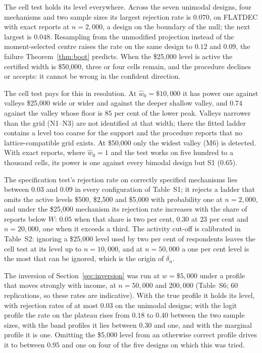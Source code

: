 The cell test holds its level everywhere. Across the seven unimodal designs, four mechanisms and two sample sizes its largest rejection rate is $0.070$, on FLATDEC with exact reports at $n=2{,}000$, a design on the boundary of the null; the next largest is $0.048$. Resampling from the unmodified projection instead of the moment-selected centre raises the rate on the same design to $0.12$ and $0.09$, the failure Theorem~\ref{thm:boot} predicts. When the \$25{,}000 level is active the certified width is \$50{,}000, three or four cells remain, and the procedure declines or accepts: it cannot be wrong in the confident direction.

The cell test pays for this in resolution. At $\hat w_0=\$10{,}000$ it has power one against valleys \$25{,}000 wide or wider and against the deeper shallow valley, and $0.74$ against the valley whose floor is $85$ per cent of the lower peak. Valleys narrower than the grid (N1--N3) are not identified at that width; there the fitted ladder contains a level too coarse for the support and the procedure reports that no lattice-compatible grid exists. At \$50{,}000 only the widest valley (M6) is detected. With exact reports, where $\hat w_0=1$ and the test works on five hundred to a thousand cells, its power is one against every bimodal design but S1 ($0.65$).

The specification test's rejection rate on correctly specified mechanisms lies between $0.03$ and $0.09$ in every configuration of Table~S1; it rejects a ladder that omits the active levels \$500, \$2{,}500 and \$5{,}000 with probability one at $n=2{,}000$, and under the \$25{,}000 mechanism its rejection rate increases with the share of reports below $W$: $0.05$ when that share is two per cent, $0.30$ at $23$ per cent and $n=20{,}000$, one when it exceeds a third. The activity cut-off is calibrated in Table~S2: ignoring a \$25{,}000 level used by two per cent of respondents leaves the cell test at its level up to $n=10{,}000$, and at $n=50{,}000$ a one per cent level is the most that can be ignored, which is the origin of $\delta_n$.

The inversion of Section~\ref{sec:inversion} was run at $w=\$5{,}000$ under a profile that moves strongly with income, at $n=50{,}000$ and $200{,}000$ (Table~S6; 60 replications, so these rates are indicative). With the true profile it holds its level, with rejection rates of at most $0.03$ on the unimodal designs; with the logit profile the rate on the plateau rises from $0.18$ to $0.40$ between the two sample sizes, with the band profiles it lies between $0.30$ and one, and with the marginal profile it is one. Omitting the \$5{,}000 level from an otherwise correct profile drives it to between $0.95$ and one on four of the five designs on which this was tried.
